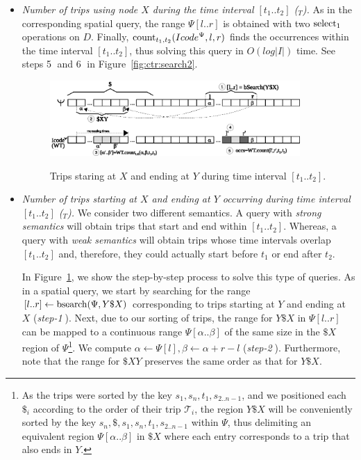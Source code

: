 \begin{itemize}
		\item {\em Number of trips using node $X$ during the time interval $[t_1..t_2]$ (\loadX$_T$).}
		As in the corresponding spatial query, the range $\Psi[l..r]$  is obtained with two $\operatorname{select}_1$ operations on $D$.
		Finally, $\operatorname{count}_{t_1,t_2}(Icode^{\Psi},l,r)$ finds the occurrences within the time interval $[t_1..t_2]$, thus solving this query in $O(log|I|)$ time.
		See steps \textcircled{5} and \textcircled{6} in Figure~\ref{fig:ctr:search2}.


	\begin{figure}[th]
		\begin{center}
			{\includegraphics[width=0.90\textwidth]{figures/search.eps}}
		\end{center}
		\caption{Trips staring at $X$ and ending at $Y$ during time interval $[t_1..t_2]$.}
		\label{fig:ctr:search}
	\end{figure}
	
		\item {\em Number of trips starting at $X$ and ending at $Y$ occurring during  time interval $[t_1..t_2]$ (\XtoY$_T$).}
		We consider two different semantics. A query with  {\em strong semantics} will obtain trips
		that start and end within  $[t_1..t_2]$. Whereas, a query with  {\em weak semantics} will obtain trips whose time intervals overlap  $[t_1..t_2]$ and, therefore, they could actually start before $t_1$ or end after $t_2$.
		
		In Figure~\ref{fig:ctr:search}, we show the step-by-step process to solve this type of queries.
		As in a spatial query, we start by searching for the range $[l..r] \leftarrow \operatorname{bsearch}(\Psi,Y\$X)$ corresponding 
		to trips starting at $Y$ and ending at $X$ ({\em step-\textcircled{1}}). Next, due to our sorting of trips, the range for $Y\$X$ in $\Psi[l..r]$
		can be mapped to a continuous range $\Psi[\alpha..\beta]$ of the same size in the $\$X$ region of $\Psi$\footnote{As the trips were sorted by the key $s_1,s_n,t_1,s_{2..n-1}$, and we positioned each $\$_i$ according to the order of their trip $\mathcal{T}_i$, the region $Y\$X$ will be conveniently sorted by the key $s_n,\$,s_1,s_n,t_1,s_{2..n-1}$ within $\Psi$, thus delimiting an equivalent region $\Psi[\alpha..\beta]$ in $\$X$ where each entry corresponds to a trip that also ends in $Y$.}. 
		We compute $\alpha \leftarrow \Psi[l], 
		\beta\leftarrow\alpha+r-l$ ({\em step-\textcircled{2}}). Furthermore, note that the range for $\$XY$ preserves the same order as that for $Y\$X$.
		

\end{itemize}
